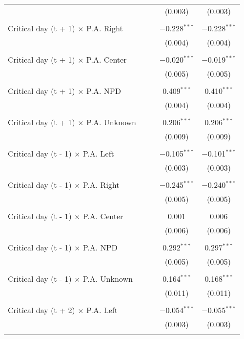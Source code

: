 \documentclass[
]{article}
\begin{document}
\begin{table}[!htbp]
{\begin{tabular}{@{\extracolsep{5pt}}lcccc}
  &  &  & (0.003) & (0.003) \\ 
  & & & & \\ 
 Critical day (t + 1) $\times$ P.A. Right &  &  & $-$0.228$^{***}$ & $-$0.228$^{***}$ \\ 
  &  &  & (0.004) & (0.004) \\ 
  & & & & \\ 
 Critical day (t + 1) $\times$ P.A. Center &  &  & $-$0.020$^{***}$ & $-$0.019$^{***}$ \\ 
  &  &  & (0.005) & (0.005) \\ 
  & & & & \\ 
 Critical day (t + 1) $\times$ P.A. NPD &  &  & 0.409$^{***}$ & 0.410$^{***}$ \\ 
  &  &  & (0.004) & (0.004) \\ 
  & & & & \\ 
 Critical day (t + 1) $\times$ P.A. Unknown &  &  & 0.206$^{***}$ & 0.206$^{***}$ \\ 
  &  &  & (0.009) & (0.009) \\ 
  & & & & \\ 
 Critical day (t - 1) $\times$ P.A. Left &  &  & $-$0.105$^{***}$ & $-$0.101$^{***}$ \\ 
  &  &  & (0.003) & (0.003) \\ 
  & & & & \\ 
 Critical day (t - 1) $\times$ P.A. Right &  &  & $-$0.245$^{***}$ & $-$0.240$^{***}$ \\ 
  &  &  & (0.005) & (0.005) \\ 
  & & & & \\ 
 Critical day (t - 1) $\times$ P.A. Center &  &  & 0.001 & 0.006 \\ 
  &  &  & (0.006) & (0.006) \\ 
  & & & & \\ 
 Critical day (t - 1) $\times$ P.A. NPD &  &  & 0.292$^{***}$ & 0.297$^{***}$ \\ 
  &  &  & (0.005) & (0.005) \\ 
  & & & & \\ 
 Critical day (t - 1) $\times$ P.A. Unknown &  &  & 0.164$^{***}$ & 0.168$^{***}$ \\ 
  &  &  & (0.011) & (0.011) \\ 
  & & & & \\ 
 Critical day (t + 2) $\times$ P.A. Left &  &  & $-$0.054$^{***}$ & $-$0.055$^{***}$ \\ 
  &  &  & (0.003) & (0.003) \\ 
  & & & & \\ 

\end{tabular}}
\end{table}
\end{document}
